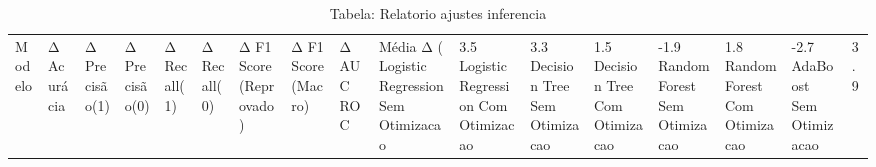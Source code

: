 \begin{table}[H] %
    \centering
    \caption{Tabela: Relatorio ajustes inferencia}
    \label{tab:relatorio_ajustes_inferencia}
    \renewcommand{\arraystretch}{1.25} %
    \begin{adjustwidth}{ -1in }{ -1in } %
    \centering %
    \small %
    \begin{tabular}{lllllllllll}
\toprule
                            Modelo & Δ Acurácia & Δ Precisão(1) & Δ Precisão(0) & Δ Recall(1) & Δ Recall(0) & Δ F1 Score (Reprovado) & Δ F1 Score (Macro) & Δ AUC ROC & Média Δ (%
\midrule
Logistic Regression Sem Otimizacao &       3.5%
Logistic Regression Com Otimizacao &       3.3%
      Decision Tree Sem Otimizacao &       1.5%
      Decision Tree Com Otimizacao &      -1.9%
      Random Forest Sem Otimizacao &       1.8%
      Random Forest Com Otimizacao &      -2.7%
           AdaBoost Sem Otimizacao &       3.9%

\end{tabular}
\end{adjustwidth}
\end{table}
